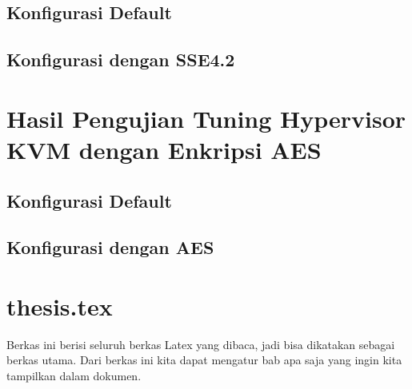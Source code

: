 \subsection{Konfigurasi Default}

\subsection{Konfigurasi dengan SSE4.2}

\section{Hasil Pengujian Tuning Hypervisor KVM dengan Enkripsi AES}

\subsection{Konfigurasi Default}

\subsection{Konfigurasi dengan AES}


\iffalse

\section{thesis.tex}
Berkas ini berisi seluruh berkas Latex yang dibaca, jadi bisa dikatakan sebagai 
berkas utama. Dari berkas ini kita dapat mengatur bab apa saja yang ingin 
kita tampilkan dalam dokumen.


